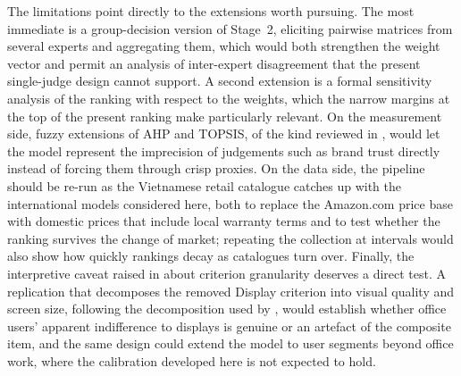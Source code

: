 The limitations point directly to the extensions worth pursuing. The most immediate is a
group-decision version of Stage~2, eliciting pairwise matrices from several experts and
aggregating them, which would both strengthen the weight vector and permit an analysis of
inter-expert disagreement that the present single-judge design cannot support. A second
extension is a formal sensitivity analysis of the ranking with respect to the weights,
which the narrow margins at the top of the present ranking make particularly relevant.
On the measurement side, fuzzy extensions of AHP and TOPSIS, of the kind reviewed in
, would let the model represent the imprecision of
judgements such as brand trust directly instead of forcing them through crisp proxies.
On the data side, the pipeline should be re-run as the Vietnamese retail catalogue
catches up with the international models considered here, both to replace the Amazon.com
price base with domestic prices that include local warranty terms and to test whether the
ranking survives the change of market; repeating the collection at intervals would also
show how quickly rankings decay as catalogues turn over. Finally, the interpretive caveat
raised in  about criterion granularity deserves a direct test.
A replication that decomposes the removed Display criterion into visual quality and screen
size, following the decomposition used by \textcite{sonmez_cakir_determination_2020},
would establish whether office users' apparent indifference to displays is genuine or an
artefact of the composite item, and the same design could extend the model to user
segments beyond office work, where the calibration developed here is not expected to
hold.
